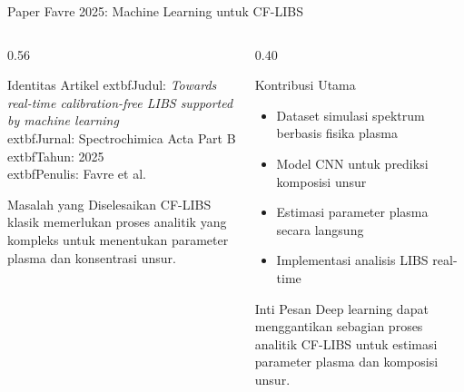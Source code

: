 \documentclass[aspectratio=169,10pt]{beamer}
\begin{document}
\begin{frame}{Paper Favre 2025: Machine Learning untuk CF-LIBS}

\begin{columns}[T]

\begin{column}{0.56\textwidth}

\begin{block}{Identitas Artikel}
\small
	extbf{Judul}: \textit{Towards real-time calibration-free LIBS supported by machine learning}\\[4pt]

	extbf{Jurnal}: Spectrochimica Acta Part B\\
	extbf{Tahun}: 2025\\[4pt]

	extbf{Penulis}: Favre et al.
\end{block}

\begin{exampleblock}{Masalah yang Diselesaikan}
\small
CF-LIBS klasik memerlukan proses analitik yang kompleks untuk menentukan parameter plasma dan konsentrasi unsur.
\end{exampleblock}

\end{column}

\begin{column}{0.40\textwidth}

\begin{block}{Kontribusi Utama}
\small
\begin{itemize}
\item Dataset simulasi spektrum berbasis fisika plasma
\item Model CNN untuk prediksi komposisi unsur
\item Estimasi parameter plasma secara langsung
\item Implementasi analisis LIBS real-time
\end{itemize}
\end{block}

\begin{alertblock}{Inti Pesan}
\small
Deep learning dapat menggantikan sebagian proses analitik CF-LIBS untuk estimasi parameter plasma dan komposisi unsur.
\end{alertblock}

\end{column}

\end{columns}

\end{frame}
\end{document}
